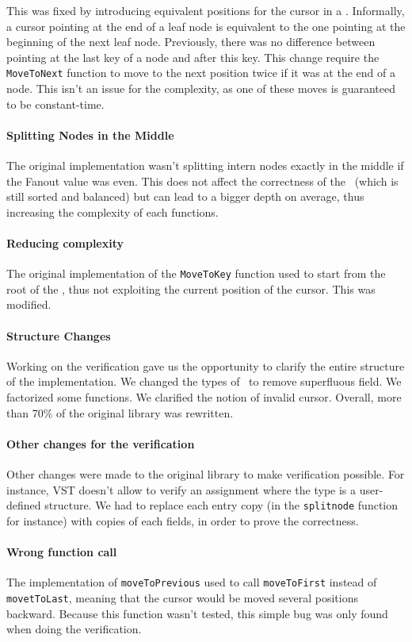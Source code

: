 This was fixed by introducing equivalent positions for the cursor in a \btree.
Informally, a cursor pointing at the end of a leaf node is equivalent to the one pointing at the beginning of the next leaf node.
Previously, there was no difference between pointing at the last key of a node and after this key.
This change require the \texttt{MoveToNext} function to move to the next position twice if it was at the end of a node.
This isn't an issue for the complexity, as one of these moves is guaranteed to be constant-time.

\paragraph{Splitting Nodes in the Middle}
The original implementation wasn't splitting intern nodes exactly in the middle if the Fanout value was even.
This does not affect the correctness of the \btree\ (which is still sorted and balanced) but can lead to a bigger depth on average, thus increasing the complexity of each functions.

\paragraph{Reducing complexity}
The original implementation of the \texttt{MoveToKey} function used to start from the root of the \btree, thus not exploiting the current position of the cursor. This was modified.

\paragraph{Structure Changes}
Working on the verification gave us the opportunity to clarify the entire structure of the implementation.
We changed the types of \btrees\ to remove superfluous field. We factorized some functions. We clarified the notion of invalid cursor.
Overall, more than 70\% of the original library was rewritten.

\paragraph{Other changes for the verification}
Other changes were made to the original library to make verification possible.
For instance, VST doesn't allow to verify an assignment where the type is a user-defined structure. 
We had to replace each entry copy (in the \texttt{splitnode} function for instance) with copies of each fields, in order to prove the correctness.

\paragraph{Wrong function call} The implementation of \texttt{moveToPrevious} used to call \texttt{moveToFirst} instead of \texttt{movetToLast}, meaning that the cursor would be moved several positions backward.
Because this function wasn't tested, this simple bug was only found when doing the verification.
